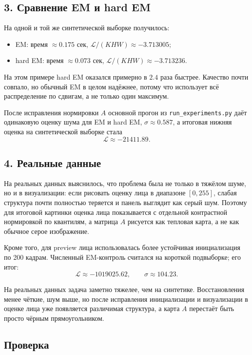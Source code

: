 \documentclass[12pt,a4paper]{article}
\begin{document}
\subsection*{3. Сравнение EM и hard EM}

На одной и той же синтетической выборке получилось:
\begin{itemize}
    \item EM: время $\approx 0.175$ сек, $\mathcal{L}/(KHW) \approx -3.713005$;
    \item hard EM: время $\approx 0.073$ сек, $\mathcal{L}/(KHW) \approx -3.713236$.
\end{itemize}

На этом примере hard EM оказался примерно в $2.4$ раза быстрее. Качество почти совпало, но обычный EM в целом надёжнее, потому что использует всё распределение по сдвигам, а не только один максимум.

После исправления нормировки $A$ основной прогон из \texttt{run\_experiments.py} даёт одинаковую оценку шума для EM и hard EM, $\sigma \approx 0.587$, а итоговая нижняя оценка на синтетической выборке стала
\[
\mathcal{L} \approx -21411.89.
\]

\subsection*{4. Реальные данные}

На реальных данных выяснилось, что проблема была не только в тяжёлом шуме, но и в визуализации: если рисовать оценку лица в диапазоне $[0,255]$, слабая структура почти полностью теряется и панель выглядит как серый шум. Поэтому для итоговой картинки оценка лица показывается с отдельной контрастной нормировкой по квантилям, а матрица $A$ рисуется как тепловая карта, а не как обычное серое изображение.

Кроме того, для preview лица использовалась более устойчивая инициализация по 200 кадрам.
Численный EM-контроль считался на короткой подвыборке; его итог:
\[
\mathcal{L} \approx -1019025.62,
\qquad
\sigma \approx 104.23.
\]

На реальных данных задача заметно тяжелее, чем на синтетике. Восстановления менее чёткие, шум выше, но после исправления инициализации и визуализации в оценке лица уже появляется различимая структура, а карта $A$ перестаёт быть просто чёрным прямоугольником.

\subsection*{Проверка}
\end{document}

